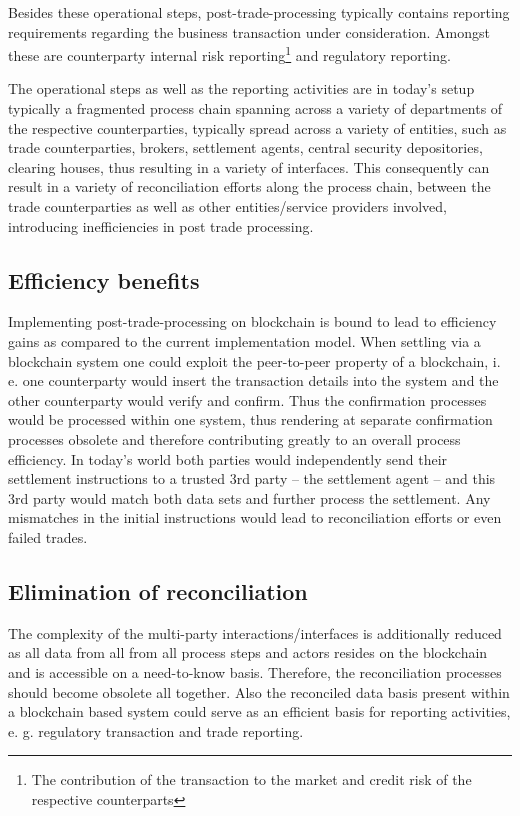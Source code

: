 Besides these operational steps, post-trade-processing typically contains reporting requirements regarding the business transaction under consideration. Amongst these are counterparty internal risk reporting\footnote{The contribution of the transaction to the market and credit risk of the respective counterparts} and regulatory reporting. 

The operational steps as well as the reporting activities are in today’s setup typically a fragmented process chain spanning across a variety of departments of the respective counterparties, typically spread across a variety of entities, such as trade counterparties, brokers, settlement agents, central security depositories, clearing houses, thus resulting in a variety of interfaces. This consequently can result in a variety of reconciliation efforts along the process chain, between the trade counterparties as well as other entities/service providers involved, introducing inefficiencies in post trade processing.
 
\subsection{Efficiency benefits}
Implementing post-trade-processing on blockchain is bound to lead to efficiency gains as compared to the current implementation model. When settling via a blockchain system one could exploit the peer-to-peer property of a blockchain, i. e. one counterparty would insert the transaction details into the system and the other counterparty would verify and confirm.  Thus the confirmation processes would be processed within one system, thus rendering at separate confirmation processes obsolete and therefore contributing greatly to an overall process efficiency. In today’s world both parties would independently send their settlement instructions to a trusted 3rd party – the settlement agent – and this 3rd party would match both data sets and further process the settlement. Any mismatches in the initial instructions would lead to reconciliation efforts or even failed trades.

\subsection{Elimination of reconciliation}
The complexity of the multi-party interactions/interfaces is additionally reduced as all data from all from all process steps and actors resides on the blockchain and is accessible on a need-to-know basis. Therefore, the reconciliation processes should become obsolete all together. Also the reconciled data basis present within a blockchain based system could serve as an efficient basis for reporting activities, e. g. regulatory transaction and trade reporting.

